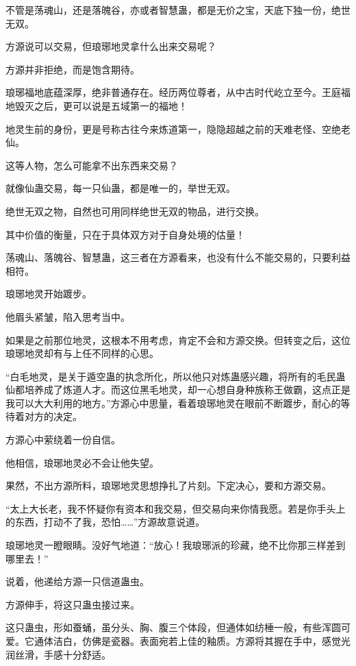 
\begin{this_body}



不管是荡魂山，还是落魄谷，亦或者智慧蛊，都是无价之宝，天底下独一份，绝世无双。

方源说可以交易，但琅琊地灵拿什么出来交易呢？

方源并非拒绝，而是饱含期待。

琅琊福地底蕴深厚，绝非普通存在。经历两位尊者，从中古时代屹立至今。王庭福地毁灭之后，更可以说是五域第一的福地！

地灵生前的身份，更是号称古往今来炼道第一，隐隐超越之前的天难老怪、空绝老仙。

这等人物，怎么可能拿不出东西来交易？

就像仙蛊交易，每一只仙蛊，都是唯一的，举世无双。

绝世无双之物，自然也可用同样绝世无双的物品，进行交换。

其中价值的衡量，只在于具体双方对于自身处境的估量！

荡魂山、落魄谷、智慧蛊，这三者在方源看来，也没有什么不能交易的，只要利益相符。

琅琊地灵开始踱步。

他眉头紧皱，陷入思考当中。

如果是之前那位地灵，这根本不用考虑，肯定不会和方源交换。但转变之后，这位琅琊地灵却有与上任不同样的心思。

“白毛地灵，是关于遁空蛊的执念所化，所以他只对炼蛊感兴趣，将所有的毛民蛊仙都培养成了炼道人才。而这位黑毛地灵，却一心想自身种族称王做霸，这点正是我可以大大利用的地方。”方源心中思量，看着琅琊地灵在眼前不断踱步，耐心的等待着对方的决定。

方源心中萦绕着一份自信。

他相信，琅琊地灵必不会让他失望。

果然，不出方源所料，琅琊地灵思想挣扎了片刻。下定决心，要和方源交易。

“太上大长老，我不怀疑你有资本和我交易，但交易向来你情我愿。若是你手头上的东西，打动不了我，恐怕……”方源故意说道。

琅琊地灵一瞪眼睛。没好气地道：“放心！我琅琊派的珍藏，绝不比你那三样差到哪里去！”

说着，他递给方源一只信道蛊虫。

方源伸手，将这只蛊虫接过来。

这只蛊虫，形如蚕蛹，虽分头、胸、腹三个体段，但通体如纺棰一般，有些浑圆可爱。它通体洁白，仿佛是瓷器。表面宛若上佳的釉质。方源将其握在手中，感觉光润丝滑，手感十分舒适。


\end{this_body}
